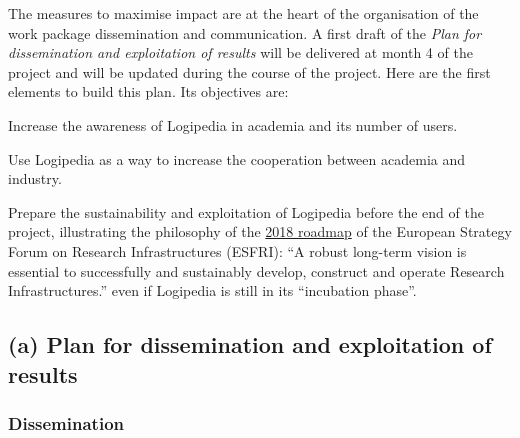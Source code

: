 The measures to maximise impact are at the heart of the organisation
of the work package dissemination and communication.
A first draft of the {\em Plan for dissemination and exploitation of
  results} will be delivered at month 4 of the project and will
be updated during the course of the project.
Here are the first elements to build this plan.
Its objectives are:
\begin{compactitem}
\item Increase the awareness of Logipedia in academia and its number of users.
\item Use Logipedia as a way to increase the cooperation between academia and
industry. 
\item Prepare the sustainability and exploitation of Logipedia before the
  end of the project, illustrating the philosophy of 
the 
\href{http://roadmap2018.esfri.eu/media/1048/rm2018-part1-20.pdf}{2018
  roadmap} of the European Strategy Forum on Research Infrastructures
(ESFRI): 
``A robust long-term vision is essential to successfully and
sustainably develop, construct and operate Research Infrastructures.''
even if Logipedia is still in its ``incubation phase''.
\end{compactitem}



\subsection*{(a) Plan for dissemination and exploitation of results}
\label{sec:dissemination}


\subsubsection*{Dissemination}


